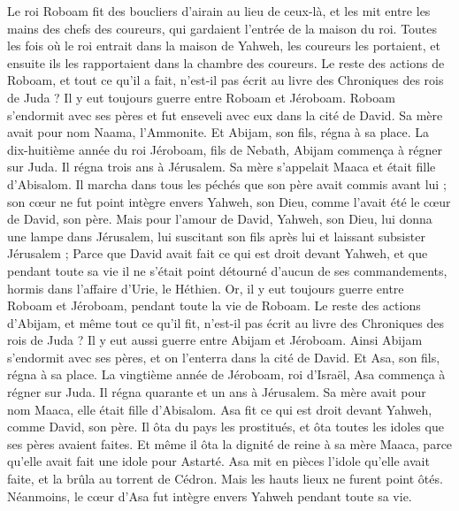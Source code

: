 \begin{multicols}{2}
Le roi Roboam fit des boucliers d'airain au lieu de ceux-là, et les mit entre les mains des chefs des coureurs, qui gardaient l’entrée de la maison du roi.
Toutes les fois où le roi entrait dans la maison de Yahweh, les coureurs les portaient, et ensuite ils les rapportaient dans la chambre des coureurs.
Le reste des actions de Roboam, et tout ce qu'il a fait, n'est-il pas écrit au livre des Chroniques des rois de Juda ?
Il y eut toujours guerre entre Roboam et Jéroboam.
Roboam s'endormit avec ses pères et fut enseveli avec eux dans la cité de David. Sa mère avait pour nom Naama, l’Ammonite. Et Abijam, son fils, régna à sa place.
\VerseOne{}La dix-huitième année du roi Jéroboam, fils de Nebath, Abijam commença à régner sur Juda.
Il régna trois ans à Jérusalem. Sa mère s’appelait Maaca et était fille d'Abisalom.
Il marcha dans tous les péchés que son père avait commis avant lui ; son cœur ne fut point intègre envers Yahweh, son Dieu, comme l'avait été le cœur de David, son père.
Mais pour l'amour de David, Yahweh, son Dieu, lui donna une lampe dans Jérusalem, lui suscitant son fils après lui et laissant subsister Jérusalem ;
Parce que David avait fait ce qui est droit devant Yahweh, et que pendant toute sa vie il ne s'était point détourné d’aucun de ses commandements, hormis dans l'affaire d'Urie, le Héthien.
Or, il y eut toujours guerre entre Roboam et Jéroboam, pendant toute la vie de Roboam.
Le reste des actions d'Abijam, et même tout ce qu'il fit, n'est-il pas écrit au livre des Chroniques des rois de Juda ? Il y eut aussi guerre entre Abijam et Jéroboam.
Ainsi Abijam s'endormit avec ses pères, et on l'enterra dans la cité de David. Et Asa, son fils, régna à sa place.
La vingtième année de Jéroboam, roi d'Israël, Asa commença à régner sur Juda.
Il régna quarante et un ans à Jérusalem. Sa mère avait pour nom Maaca, elle était fille d'Abisalom.
Asa fit ce qui est droit devant Yahweh, comme David, son père.
Il ôta du pays les prostitués, et ôta toutes les idoles que ses pères avaient faites.
Et même il ôta la dignité de reine à sa mère Maaca, parce qu'elle avait fait une idole pour Astarté. Asa mit en pièces l’idole qu'elle avait faite, et la brûla au torrent de Cédron.
Mais les hauts lieux ne furent point ôtés. Néanmoins, le cœur d'Asa fut intègre envers Yahweh pendant toute sa vie.

\end{multicols}
